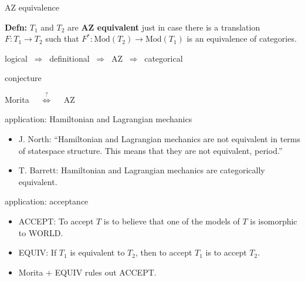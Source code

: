 \documentclass[17pt]{beamer}
\begin{document}
\begin{frame}{\small AZ equivalence}

  \textbf{Defn:} $T_1$ and $T_2$ are \textbf{AZ equivalent} just in
  case there is a translation $F:T_1\to T_2$ such that
  $F^*:\mathrm{Mod}(T_2)\to \mathrm{Mod}(T_1)$ is an equivalence of
  categories. 


\end{frame}


\begin{frame}

\begin{center} {\small logical $\:\Longrightarrow\:$ definitional $\:\Longrightarrow\:$
AZ $\:\Longrightarrow\:$ categorical}  \end{center}

\end{frame}



\begin{frame}{\small conjecture}

  \begin{center} {\LARGE Morita
      $\quad\stackrel{?}{\Longleftrightarrow}\quad$ AZ} \end{center}


\end{frame}


\begin{frame}{\small application: Hamiltonian and Lagrangian mechanics}


\begin{itemize}
\item J. North: ``Hamiltonian and Lagrangian mechanics are not
  equivalent in terms of statespace structure.  This means that they
  are not equivalent, period.''
\item T. Barrett: Hamiltonian and Lagrangian mechanics are
  categorically equivalent.
\end{itemize}


\end{frame}


\begin{frame}{\small application: acceptance}


\begin{itemize}
\item ACCEPT: To accept $T$ is to believe that one of the models of
  $T$ is isomorphic to WORLD.
\item EQUIV: If $T_1$ is equivalent to $T_2$, then to accept $T_1$ is
  to accept $T_2$.
\item Morita + EQUIV rules out ACCEPT.
\end{itemize}


\end{frame}
\end{document}
